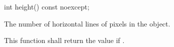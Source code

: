 \begin{itemdecl}
int height() const noexcept;
\end{itemdecl}
\begin{itemdescr}
\pnum
\returns
The number of horizontal lines of pixels in the  object.

\pnum
\remarks
This function shall return the value  if .
\end{itemdescr}
